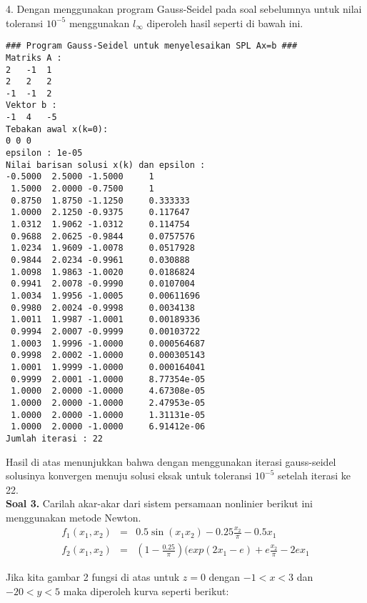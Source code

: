 \documentclass[paper=a4, fontsize=11pt]{scrartcl}
\numberwithin{equation}{section} %
\numberwithin{figure}{section} %
\numberwithin{table}{section} %
\begin{document}
4. Dengan menggunakan program Gauss-Seidel pada soal sebelumnya untuk nilai toleransi $10^{-5}$ menggunakan $l_{\infty}$ diperoleh hasil seperti di bawah ini.
\begin{small}
\begin{verbatim}
### Program Gauss-Seidel untuk menyelesaikan SPL Ax=b ###
Matriks A : 
2	-1	1	
2	2	2	
-1	-1	2	
Vektor b : 
-1	4	-5	
Tebakan awal x(k=0): 
0 0 0 
epsilon : 1e-05
Nilai barisan solusi x(k) dan epsilon : 
-0.5000  2.5000 -1.5000 	1
 1.5000  2.0000 -0.7500 	1
 0.8750  1.8750 -1.1250 	0.333333
 1.0000  2.1250 -0.9375 	0.117647
 1.0312  1.9062 -1.0312 	0.114754
 0.9688  2.0625 -0.9844 	0.0757576
 1.0234  1.9609 -1.0078 	0.0517928
 0.9844  2.0234 -0.9961 	0.030888
 1.0098  1.9863 -1.0020 	0.0186824
 0.9941  2.0078 -0.9990 	0.0107004
 1.0034  1.9956 -1.0005 	0.00611696
 0.9980  2.0024 -0.9998 	0.0034138
 1.0011  1.9987 -1.0001 	0.00189336
 0.9994  2.0007 -0.9999 	0.00103722
 1.0003  1.9996 -1.0000 	0.000564687
 0.9998  2.0002 -1.0000 	0.000305143
 1.0001  1.9999 -1.0000 	0.000164041
 0.9999  2.0001 -1.0000 	8.77354e-05
 1.0000  2.0000 -1.0000 	4.67308e-05
 1.0000  2.0000 -1.0000 	2.47953e-05
 1.0000  2.0000 -1.0000 	1.31131e-05
 1.0000  2.0000 -1.0000 	6.91412e-06
Jumlah iterasi : 22
\end{verbatim}
\end{small}
Hasil di atas menunjukkan bahwa dengan menggunakan iterasi gauss-seidel solusinya konvergen menuju solusi eksak untuk toleransi $10^{-5}$ setelah iterasi ke 22.\\

\vspace{1cm}
\large \textbf{Soal 3.}
Carilah akar-akar dari sistem persamaan nonlinier berikut ini menggunakan metode Newton.\\
\begin{eqnarray}
f_{1}(x_{1}, x_{2}) &=& 0.5\sin(x_{1}x_{2}) - 0.25\frac{x_{2}}{\pi} - 0.5x_{1}\\
f_{2}(x_{1}, x_{2}) &=& (1-\frac{0.25}{\pi})(exp(2x_{1} - e) + e\frac{x_{2}}{\pi} - 2ex_{1}
\end{eqnarray}

Jika kita gambar 2 fungsi di atas untuk $z=0$ dengan $ -1<x<3 $ dan $ -20<y<5 $ maka diperoleh kurva seperti berikut:
\end{document}
